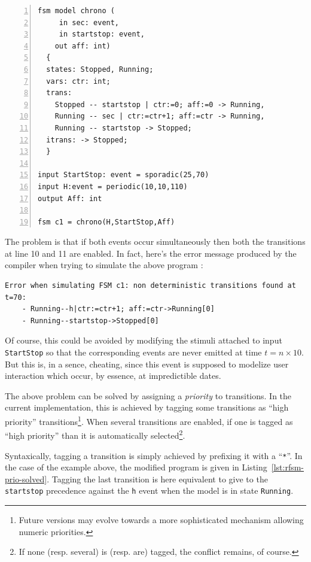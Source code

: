 \begin{lstlisting}[language=Rfsm,frame=single,numbers=left,caption=A program showing a potentially non-deterministic
  model,label={lst:rfsm-prio-pb},float]
fsm model chrono (
     in sec: event,
     in startstop: event,
    out aff: int)
  {
  states: Stopped, Running;
  vars: ctr: int;
  trans:
    Stopped -- startstop | ctr:=0; aff:=0 -> Running,
    Running -- sec | ctr:=ctr+1; aff:=ctr -> Running,
    Running -- startstop -> Stopped;
  itrans: -> Stopped;
  }

input StartStop: event = sporadic(25,70)
input H:event = periodic(10,10,110)
output Aff: int

fsm c1 = chrono(H,StartStop,Aff)
\end{lstlisting}

The problem is that if both events occur simultaneously  then
both the transitions at line 10 and 11 are enabled. In fact, here's the error message produced by
the compiler when trying to simulate the above program :

\small
\begin{verbatim}
Error when simulating FSM c1: non deterministic transitions found at t=70:
	- Running--h|ctr:=ctr+1; aff:=ctr->Running[0]
	- Running--startstop->Stopped[0]
\end{verbatim}
\normalsize

Of course, this could be avoided by modifying the stimuli attached to input \verb|StartStop| so that the
corresponding events are never emitted at time $t=n\times 10$. But this is, in a sence, cheating,
since this event is supposed to modelize user interaction which occur, by essence, at impredictible
dates. 

The above problem can be solved by assigning a \emph{priority} to transitions. In the current
implementation, this is achieved by tagging some transitions as ``high priority''
transitions\footnote{Future versions may evolve towards a more sophisticated mechanism allowing
  numeric priorities.}.  When several transitions are enabled, if one is tagged as ``high priority''
than it is automatically selected\footnote{If none (resp. several) is (resp. are) tagged, the
  conflict remains, of course.}. 

Syntaxically, tagging a transition is simply achieved by prefixing it with a ``\verb|*|''. In the
case of the example above, the modified program is given in
Listing~\ref{lst:rfsm-prio-solved}. Tagging the last transition is here equivalent to give to the
\verb|startstop| precedence against the \verb|h| event when the model is in state
\verb|Running|.

